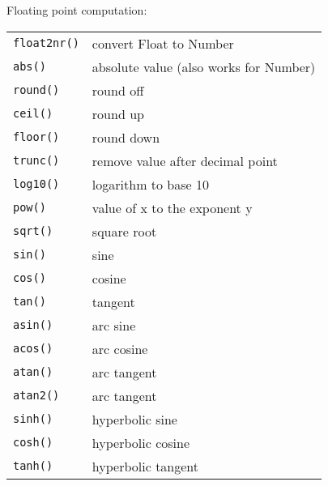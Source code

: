 Floating point computation:
\label{float-functions}
\begin{center} \begin{tabular}{l l}
				\texttt{float2nr()} & convert Float to Number \\
				\texttt{abs()} & absolute value (also works for Number) \\
				\texttt{round()} & round off \\
				\texttt{ceil()} & round up \\
				\texttt{floor()} & round down \\
				\texttt{trunc()} & remove value after decimal point \\
				\texttt{log10()} & logarithm to base 10 \\
				\texttt{pow()} & value of x to the exponent y \\
				\texttt{sqrt()} & square root \\
				\texttt{sin()} & sine \\
				\texttt{cos()} & cosine \\
				\texttt{tan()} & tangent \\
				\texttt{asin()} & arc sine \\
				\texttt{acos()} & arc cosine \\
				\texttt{atan()} & arc tangent \\
				\texttt{atan2()} & arc tangent \\
				\texttt{sinh()} & hyperbolic sine \\
				\texttt{cosh()} & hyperbolic cosine \\
				\texttt{tanh()} & hyperbolic tangent \\
\end{tabular} \end{center}


